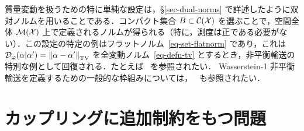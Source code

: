 \begin{rem}[双対ノルムとの関連]\label{rem-unb-dualnorms}
質量変動を扱うための特に単純な設定は，\S\ref{sec-dual-norms} で詳述したように双対ノルムを用いることである．コンパクト集合 $B \subset \mathcal{C}(\mathcal{X})$ を選ぶことで，空間全体 $\mathcal{M}(\mathcal{X})$ 上で定義されるノルムが得られる（特に，測度は正である必要がない）．この設定の特定の例はフラットノルム~\eqref{eq-set-flatnorm} であり，これは $\mathcal{D}_\varphi(\alpha|\alpha')=\left\| \alpha-\alpha' \right\|_{\operatorname{TV}}$ を全変動ノルム~\eqref{eq-defn-tv} とするとき，非平衡輸送の特別な例として回復される．たとえば~\citep{hanin1992kantorovich,lellmann2014imaging} を参照されたい．
%
Wasserstein-1 非平衡輸送を定義するための一般的な枠組みについては，~\citep{schmitzer2017framework} も参照されたい．
\end{rem}

\section{カップリングに追加制約をもつ問題}

